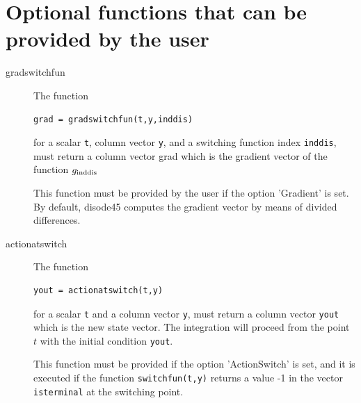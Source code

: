 \documentclass{article}
\begin{document}
\section{Optional functions that can be provided by the user}
\label{optionalfunctions}

\begin{description}
\item[gradswitchfun]
The function

\begin{verbatim}
grad = gradswitchfun(t,y,inddis)
\end{verbatim}

\noindent for a scalar \texttt{t}, column vector \texttt{y}, and a switching function index \texttt{inddis}, must return a column vector grad which is the gradient vector
of the function $g_{\scriptsize\hbox{inddis}}$

This function must be provided by the user if the option 'Gradient' is set.  By default,
disode45 computes the gradient vector by means of divided differences.

\item[actionatswitch]
The function

\begin{verbatim}
yout = actionatswitch(t,y)
\end{verbatim}

\noindent for a scalar \texttt{t} and a column vector \texttt{y}, must return a column vector \texttt{yout} which is the new state vector.  The integration will proceed from the point
$t$ with the initial condition \texttt{yout}.

This function must be provided if the option 'ActionSwitch' is set, and it is executed if the function \texttt{switchfun(t,y)} returns a value -1 in the vector
\texttt{isterminal} at the switching point.
\end{description}
\end{document}
